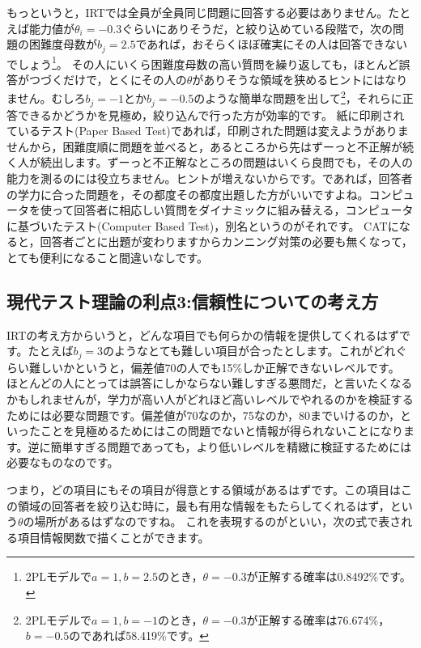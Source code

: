 \documentclass{ltjsbook}
\begin{document}
もっというと，IRTでは全員が全員同じ問題に回答する必要はありません。たとえば能力値が$\theta_i = -0.3$ぐらいにありそうだ，と絞り込めている段階で，次の問題の困難度母数が$b_j = 2.5$であれば，おそらくほぼ確実にその人は回答できないでしょう\footnote{2PLモデルで$a=1,b=2.5$のとき，$\theta=-0.3$が正解する確率は0.8492\%です。}。
その人にいくら困難度母数の高い質問を繰り返しても，ほとんど誤答がつづくだけで，とくにその人の$\theta$がありそうな領域を狭めるヒントにはなりません。むしろ$b_j=-1$とか$b_j=-0.5$のような簡単な問題を出して\footnote{2PLモデルで$a=1,b=-1$のとき，$\theta=-0.3$が正解する確率は76.674\%，$b=-0.5$のであれば58.419\%です。}，それらに正答できるかどうかを見極め，絞り込んで行った方が効率的です。
紙に印刷されているテスト(Paper Based Test)であれば，印刷された問題は変えようがありませんから，困難度順に問題を並べると，あるところから先はずーっと不正解が続く人が続出します。ずーっと不正解なところの問題はいくら良問でも，その人の能力を測るのには役立ちません。ヒントが増えないからです。であれば，回答者の学力に合った問題を，その都度その都度出題した方がいいですよね。コンピュータを使って回答者に相応しい質問をダイナミックに組み替える，コンピュータに基づいたテスト(Computer Based Test)，別名というのがそれです。
CATになると，回答者ごとに出題が変わりますからカンニング対策の必要も無くなって，とても便利になること間違いなしです。

\subsection{現代テスト理論の利点3:信頼性についての考え方}
IRTの考え方からいうと，どんな項目でも何らかの情報を提供してくれるはずです。たとえば$b_j=3$のようなとても難しい項目が合ったとします。これがどれぐらい難しいかというと，偏差値70の人でも15\%しか正解できないレベルです。
ほとんどの人にとっては誤答にしかならない難しすぎる悪問だ，と言いたくなるかもしれませんが，学力が高い人がどれほど高いレベルでやれるのかを検証するためには必要な問題です。偏差値が70なのか，75なのか，80までいけるのか，といったことを見極めるためにはこの問題でないと情報が得られないことになります。逆に簡単すぎる問題であっても，より低いレベルを精緻に検証するためには必要なものなのです。

つまり，どの項目にもその項目が得意とする領域があるはずです。この項目はこの領域の回答者を絞り込む時に，最も有用な情報をもたらしてくれるはず，という$\theta$の場所があるはずなのですね。
これを表現するのがといい，次の式で表される項目情報関数で描くことができます。
\end{document}
